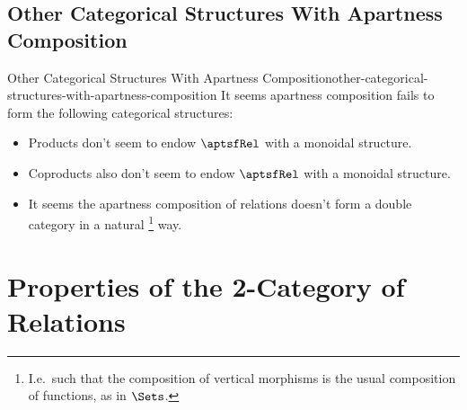 \subsection{Other Categorical Structures With Apartness Composition}\label{subsection-other-categorical-structures-with-apartness-composition}
\begin{remark}{Other Categorical Structures With Apartness Composition}{other-categorical-structures-with-apartness-composition}%
    It seems apartness composition fails to form the following categorical structures:
    \begin{itemize}
        \item\label{other-categorical-structures-with-apartness-composition-monoidal-category-with-products}Products don't seem to endow $\aptsfRel$ with a monoidal structure.
        \item\label{other-categorical-structures-with-apartness-composition-monoidal-category-with-coproducts}Coproducts also don't seem to endow $\aptsfRel$ with a monoidal structure.
        \item\label{other-categorical-structures-with-apartness-composition-double-categorical-structure}It seems the apartness composition of relations doesn't form a double category in a natural%
            \footnote{%
                I.e.\ such that the composition of vertical morphisms is the usual composition of functions, as in $\Sets$.
                \par\vspace*{\TCBBoxCorrection}
            } %
            way.
    \end{itemize}
\end{remark}
\section{Properties of the 2-Category of Relations}\label{section-properties-of-the-2-category-of-relations}
